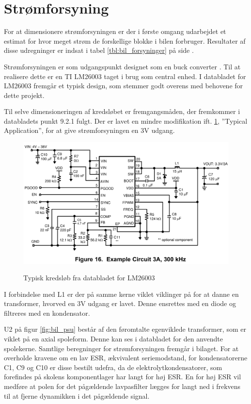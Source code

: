 \section{Strømforsyning}\label{sec:car_psu} %

For at dimensionere strømforsyningen er der i første omgang udarbejdet et estimat for hvor meget strøm de forskellige blokke i bilen forbruger.
Resultater af disse udregninger er indsat i tabel \ref{tbl:bil_forsyninger} på side \pageref{tbl:bil_forsyninger}.

Strømforsyningen er som udgangspunkt designet som en buck converter \cite[afsnit 6.10]{lib:analogteknik}.
Til at realisere dette er en TI LM26003 taget i brug som central enhed.
I databladet for LM26003\cite{lib:lm26003} fremgår et typisk design, som stemmer godt overens med behovene for dette projekt.

Til selve dimensioneringen af kredsløbet er fremgangsmåden, der fremkommer i databladets punkt 9.2.1 fulgt. 
Der er lavet en mindre modifikation ift. \ref{fig:lm26003fig16}, ''Typical Application'', for at give strømforsyningen en 3V udgang.

\begin{figure}[h]
\centering
\includegraphics[width=\textwidth* 9/10]{../fig/billeder/lm26003fig16}
\label{fig:lm26003fig16}
\caption{Typisk kredsløb fra databladet for LM26003}
\end{figure}

I forbindelse med L1 er der på samme kerne viklet viklinger på for at danne en transformer, hvorved en 3V udgang er lavet. 
Denne ensrettes med en diode og filtreres med en kondensator. 

U2 på figur \ref{fig:bil_psu} består af den føromtalte egenviklede transformer, som er viklet på en axial spoleform. 
Denne kan ses i databladet for den anvendte spolekerne\cite{lib:psu_L1core}. 
Samtlige beregninger for strømforsyningen fremgår i bilaget\cite{lib:psu_calcs}.
For at overholde kravene om en lav ESR, ækvivalent seriemodstand, for kondensatorerne C1, C9 og C10 er disse bestilt udefra, da de elektrolytkondensatorer, som forefindes på skolens komponentlager har langt for høj ESR. 
En for høj ESR vil medføre at polen for det pågældende lavpasfilter lægges for langt ned i frekvens til at fjerne dynamikken i det pågældende signal.

